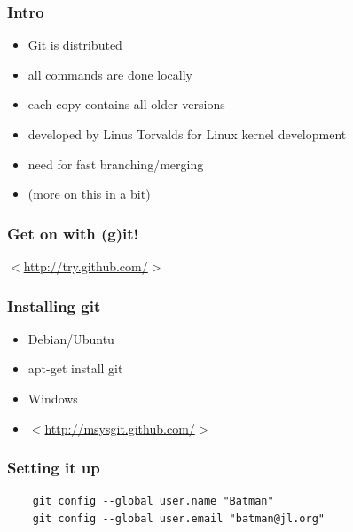 \documentclass[%
        hyperref={%
                pdfauthor={Zakariyya Mughal},%
                pdfpagemode={None},pdfpagelayout={SinglePage}}%
        xcolor={x11names},%
]{beamer}
\begin{document}
\begin{frame}
\frametitle{Intro}
\begin{itemize}
	\item [] Git is distributed
	\pause \item []\qquad all commands are done locally
	\pause \item []\qquad\qquad each copy contains all older versions
	\pause \item []\qquad developed by Linus Torvalds for
		Linux kernel development
	\pause \item []\qquad\qquad need for fast branching/merging
	\item []\qquad\qquad	(more on this in a bit)
\end{itemize}
\end{frame}

\begin{frame}
\frametitle{Get on with (g)it!}
\begin{center}
\Huge
$<$\href{http://try.github.com/}{http://try.github.com/}$>$
\end{center}
\end{frame}

\begin{frame}
\frametitle{Installing git}
\begin{itemize}
	\item []Debian/Ubuntu
	\item[]\qquad apt-get install git
	\pause \item[]Windows
	\item[]\qquad $<$\href{http://msysgit.github.com/}{http://msysgit.github.com/}$>$
\end{itemize}
\end{frame}

\begin{frame}[fragile]
\frametitle{Setting it up}
\begin{verbatim}
	git config --global user.name "Batman"
	git config --global user.email "batman@jl.org"
\end{verbatim}
\end{frame}
\end{document}

